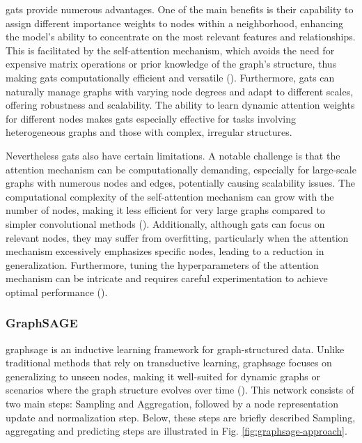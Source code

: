 \glspl{gat} provide numerous advantages.
One of the main benefits is their capability to assign different importance weights to nodes within a neighborhood, enhancing the model's ability to concentrate on the most relevant features and relationships.
This is facilitated by the self-attention mechanism, which avoids the need for expensive matrix operations or prior knowledge of the graph's structure, thus making \glspl{gat} computationally efficient and versatile (\cite{Velickovic2018}).
Furthermore, \glspl{gat} can naturally manage graphs with varying node degrees and adapt to different scales, offering robustness and scalability.
The ability to learn dynamic attention weights for different nodes makes \glspl{gat} especially effective for tasks involving heterogeneous graphs and those with complex, irregular structures.

Nevertheless \glspl{gat} also have certain limitations.
A notable challenge is that the attention mechanism can be computationally demanding, especially for large-scale graphs with numerous nodes and edges, potentially causing scalability issues.
The computational complexity of the self-attention mechanism can grow with the number of nodes, making it less efficient for very large graphs compared to simpler convolutional methods (\cite{Thekumparampil2018}).
Additionally, although \glspl{gat} can focus on relevant nodes, they may suffer from overfitting, particularly when the attention mechanism excessively emphasizes specific nodes, leading to a reduction in generalization.
Furthermore, tuning the hyperparameters of the attention mechanism can be intricate and requires careful experimentation to achieve optimal performance (\cite{Lee2018}).

\subsubsection*{GraphSAGE}

\gls{graphsage} is an inductive learning framework for graph-structured data.
Unlike traditional methods that rely on transductive learning, \gls{graphsage} focuses on generalizing to unseen nodes, making it well-suited for dynamic graphs or scenarios where the graph structure evolves over time (\cite{Hamilton2017}).
This network consists of two main steps: Sampling and Aggregation, followed by a node representation update and normalization step.
Below, these steps are briefly described
Sampling, aggregating and predicting steps are illustrated in Fig. \ref{fig:graphsage-approach}.


